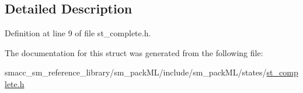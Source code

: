 \subsection{Detailed Description}


Definition at line 9 of file st\+\_\+complete.\+h.



The documentation for this struct was generated from the following file\+:\begin{DoxyCompactItemize}
\item 
smacc\+\_\+sm\+\_\+reference\+\_\+library/sm\+\_\+pack\+M\+L/include/sm\+\_\+pack\+M\+L/states/\hyperlink{sm__packML_2include_2sm__packML_2states_2st__complete_8h}{st\+\_\+complete.\+h}\end{DoxyCompactItemize}
